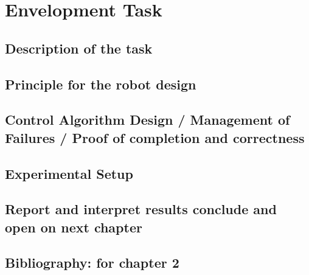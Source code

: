 \chapter{Envelopment Task}

\section{Description of the task}
\section{Principle for the robot design} 
\section{Control Algorithm Design / Management of Failures / Proof of completion and correctness} 
\section{Experimental Setup} 
\section{Report and interpret results conclude and open on next chapter} 
\section{Bibliography: for chapter 2}